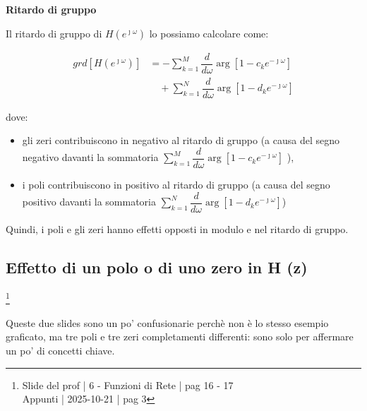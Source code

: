 \textbf{Ritardo di gruppo} \newline 

Il ritardo di gruppo di $H \left(e^{\jmath \omega}\right)$ lo possiamo calcolare come: 

{
    \Large 
    \begin{equation}
        \begin{split}
        grd \left[ H \left( e^{\jmath \omega}\right)\right]
        &= 
        -
        \sum_{k = 1}^{M}
        \dfrac{d}{d \omega}
        \arg
        \left[  1 - c_k e^{-\jmath \omega} \right]
        \\
        &\quad
        +
        \sum_{k = 1}^{N}
        \dfrac{d}{d \omega}
        \arg
        \left[ 1 - d_k e^{-\jmath \omega} \right] 
        \end{split}
    \end{equation}
}

dove: 

\begin{itemize}
    \item gli zeri contribuiscono in negativo al ritardo di gruppo (a causa del segno negativo davanti la sommatoria $\sum_{k = 1}^{M} \dfrac{d}{d \omega} \arg \left[  1 - c_k e^{-\jmath \omega} \right]$ ), 
    \item i poli contribuiscono in positivo al ritardo di gruppo (a causa del segno positivo davanti la sommatoria $\sum_{k = 1}^{N} \dfrac{d}{d \omega} \arg \left[ 1 - d_k e^{-\jmath \omega} \right] $)
\end{itemize} 

Quindi, i poli e gli zeri hanno effetti opposti in modulo e nel ritardo di gruppo. \newline 

\newpage 

\subsection{Effetto di un polo o di uno zero in H (z)}

\footnote{ 
    Slide del prof | 6 - Funzioni di Rete | pag 16 - 17\\
    Appunti | 2025-10-21 | pag 3
} 

\begin{tcolorbox}
    Queste due slides sono un po' confusionarie perchè non è lo stesso esempio graficato, ma tre poli e tre zeri completamenti differenti: sono solo per affermare un po' di concetti chiave. 
\end{tcolorbox}

